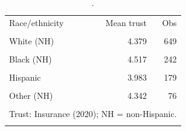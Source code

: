 \begin{table}[htbp]\centering
\caption{.}
\label{tab:trust_mean_by_race_eth_insurance_2020}
\begin{tabular}{lrr}\toprule
Race/ethnicity & Mean trust & Obs \\\\ \midrule
White (NH) & 4.379 & 649 \\\\
Black (NH) & 4.517 & 242 \\\\
Hispanic & 3.983 & 179 \\\\
Other (NH) & 4.342 & 76 \\\\
\bottomrule
\multicolumn{3}{l}{\footnotesize Trust: Insurance (2020); NH = non-Hispanic.} \\\\
\end{tabular}
\end{table}
